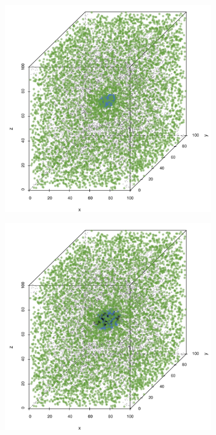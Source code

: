 	\begin{figure}
		\centering
		\begin{subfigure}{0.23\textwidth}
			\centering
			\includegraphics[keepaspectratio=true, width=\textwidth, height=0.23\textheight]{discussion/img/anisotropy_1_60000_anisotropy.png}
			\caption{\anisotropyOne}
			\label{fig:discussion:anisotropy:anisotropy1}
		\end{subfigure}
		\begin{subfigure}{0.23\textwidth}
			\centering
			\includegraphics[keepaspectratio=true, width=\textwidth, height=0.23\textheight]{discussion/img/anisotropy_2_60000_anisotropy.png}

\end{subfigure}
\end{figure}
